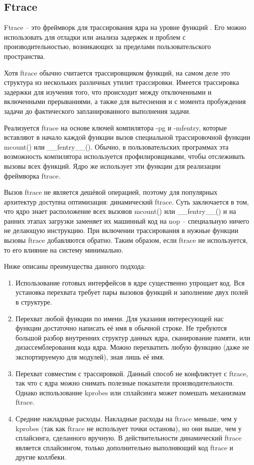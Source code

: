 	\subsection{Ftrace}
		Ftrace -- это фреймворк для трассирования ядра на уровне функций \cite{ftrace}.
		Его можно использовать для отладки или анализа задержек и проблем с производительностью, 
		возникающих за пределами пользовательского пространства.

		Хотя ftrace обычно считается трассировщиком функций, 
		на самом деле это структура из нескольких различных утилит трассировки. 
		Имеется трассировка задержки для изучения того, 
		что происходит между отключенными и включенными прерываниями, 
		а также для вытеснения и с момента пробуждения задачи до фактического запланированного выполнения задачи.
		
		Реализуется ftrace на основе ключей компилятора -pg и -mfentry, 
		которые вставляют в начало каждой функции вызов специальной трассировочной функции 
		mcount() или \_\_fentry\_\_(). 
		Обычно, в пользовательских программах эта возможность компилятора используется профилировщиками,
		чтобы отслеживать вызовы всех функций. Ядро же использует эти функции для реализации фреймворка ftrace.

		Вызов ftrace не является дешёвой операцией,
		поэтому для популярных архитектур доступна оптимизация: динамический ftrace. 
		Суть заключается в том, что ядро знает расположение всех вызовов mcount() или \_\_fentry\_\_() 
		и на ранних этапах загрузки заменяет их машинный код на nop -- специальную ничего не делающую инструкцию. 
		При включении трассирования в нужные функции вызовы ftrace добавляются обратно. 
		Таким образом, если ftrace не используется, то его влияние на систему минимально.

		Ниже описаны преимущества данного подхода:
		\begin{enumerate}
			\item Использование готовых интерфейсов в ядре существенно упрощает код. 
				Вся установка перехвата требует пары вызовов функций и заполнение двух полей в структуре.
			\item Перехват любой функции по имени. 
				Для указания интересующей нас функции достаточно написать её имя в обычной строке. 
				Не требуются большой разбор внутренних структур данных ядра, сканирование памяти, или дизассемблерования кода ядра.
				Можно перехватить любую функцию (даже не экспортируемую для модулей), зная лишь её имя.
			\item Перехват совместим с трассировкой.
				Данный способ не конфликтует с ftrace,
				так что с ядра можно снимать полезные показатели производительности. 
				Однако использование kprobes или сплайсинга может помешать механизмам ftrace.
			\item Средние накладные расходы. 
				Накладные расходы на ftrace меньше, чем у kprobes (так как ftrace не использует точки останова),
				но они выше, чем у сплайсинга, сделанного вручную. 
				В действительности динамический ftrace является сплайсингом, только дополнительно выполняющий код ftrace и другие коллбеки.
		\end{enumerate}


